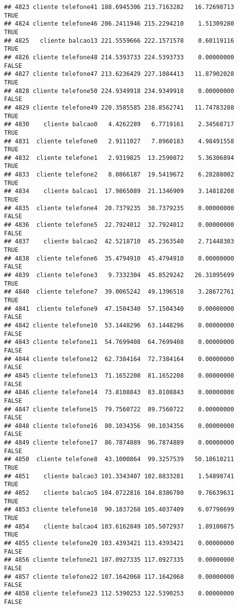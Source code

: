 \documentclass[
]{article}
\begin{document}
\begin{verbatim}
## 4823 cliente telefone41 188.6945306 213.7163282   16.72698713     TRUE
## 4824 cliente telefone46 206.2411946 215.2294210    1.51309280     TRUE
## 4825   cliente balcao13 221.5559666 222.1571578    0.60119116     TRUE
## 4826 cliente telefone48 214.5393733 224.5393733    0.00000000    FALSE
## 4827 cliente telefone47 213.6236429 227.1084413   11.87902028     TRUE
## 4828 cliente telefone50 224.9349918 234.9349918    0.00000000    FALSE
## 4829 cliente telefone49 220.3585585 238.8562741   11.74783288     TRUE
## 4830    cliente balcao0   4.4262289   6.7719161    2.34568717     TRUE
## 4831  cliente telefone0   2.9111027   7.8960183    4.98491558     TRUE
## 4832  cliente telefone1   2.9319825  13.2590872    5.36306894     TRUE
## 4833  cliente telefone2   8.0866187  19.5419672    6.28288002     TRUE
## 4834    cliente balcao1  17.9865089  21.1346909    3.14818208     TRUE
## 4835  cliente telefone4  20.7379235  30.7379235    0.00000000    FALSE
## 4836  cliente telefone5  22.7924012  32.7924012    0.00000000    FALSE
## 4837    cliente balcao2  42.5218710  45.2363540    2.71448303     TRUE
## 4838  cliente telefone6  35.4794910  45.4794910    0.00000000    FALSE
## 4839  cliente telefone3   9.7332304  45.8529242   26.31095699     TRUE
## 4840  cliente telefone7  39.0065242  49.1396518    3.28672761     TRUE
## 4841  cliente telefone9  47.1504340  57.1504340    0.00000000    FALSE
## 4842 cliente telefone10  53.1448296  63.1448296    0.00000000    FALSE
## 4843 cliente telefone11  54.7699408  64.7699408    0.00000000    FALSE
## 4844 cliente telefone12  62.7384164  72.7384164    0.00000000    FALSE
## 4845 cliente telefone13  71.1652208  81.1652208    0.00000000    FALSE
## 4846 cliente telefone14  73.8108843  83.8108843    0.00000000    FALSE
## 4847 cliente telefone15  79.7560722  89.7560722    0.00000000    FALSE
## 4848 cliente telefone16  80.1034356  90.1034356    0.00000000    FALSE
## 4849 cliente telefone17  86.7874889  96.7874889    0.00000000    FALSE
## 4850  cliente telefone8  43.1000864  99.3257539   50.18610211     TRUE
## 4851    cliente balcao3 101.3343407 102.8833281    1.54898741     TRUE
## 4852    cliente balcao5 104.0722816 104.8386780    0.76639631     TRUE
## 4853 cliente telefone18  90.1837268 105.4037409    6.07798699     TRUE
## 4854    cliente balcao4 103.6162849 105.5072937    1.89100875     TRUE
## 4855 cliente telefone20 103.4393421 113.4393421    0.00000000    FALSE
## 4856 cliente telefone21 107.0927335 117.0927335    0.00000000    FALSE
## 4857 cliente telefone22 107.1642068 117.1642068    0.00000000    FALSE
## 4858 cliente telefone23 112.5390253 122.5390253    0.00000000    FALSE

\end{verbatim}
\end{document}
